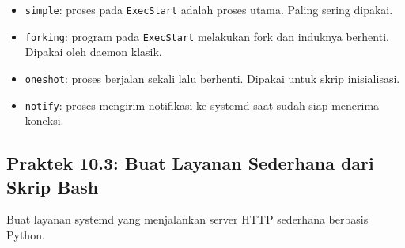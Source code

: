 \begin{itemize}
    \item \texttt{simple}: proses pada \texttt{ExecStart} adalah proses utama. Paling sering dipakai.
    \item \texttt{forking}: program pada \texttt{ExecStart} melakukan fork dan induknya berhenti. Dipakai oleh daemon klasik.
    \item \texttt{oneshot}: proses berjalan sekali lalu berhenti. Dipakai untuk skrip inisialisasi.
    \item \texttt{notify}: proses mengirim notifikasi ke systemd saat sudah siap menerima koneksi.
\end{itemize}

\subsection*{Praktek 10.3: Buat Layanan Sederhana dari Skrip Bash}

Buat layanan systemd yang menjalankan server HTTP sederhana berbasis Python.

